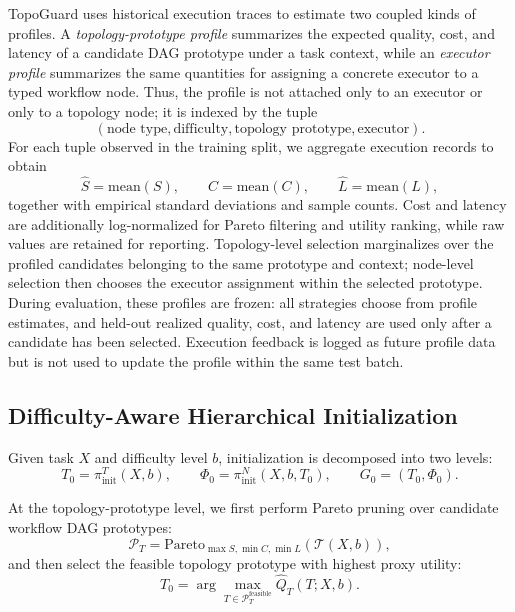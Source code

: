 \documentclass[acmsmall,review,anonymous]{acmart}
\begin{document}
TopoGuard uses historical execution traces to estimate two coupled kinds of profiles. A \emph{topology-prototype profile} summarizes the expected quality, cost, and latency of a candidate DAG prototype under a task context, while an \emph{executor profile} summarizes the same quantities for assigning a concrete executor to a typed workflow node. Thus, the profile is not attached only to an executor or only to a topology node; it is indexed by the tuple
\[
(\text{node type},\text{difficulty},\text{topology prototype},\text{executor}).
\]
For each tuple observed in the training split, we aggregate execution records to obtain
\[
\widehat{S}=\mathrm{mean}(S),\qquad
\widehat{C}=\mathrm{mean}(C),\qquad
\widehat{L}=\mathrm{mean}(L),
\]
together with empirical standard deviations and sample counts. Cost and latency are additionally log-normalized for Pareto filtering and utility ranking, while raw values are retained for reporting. Topology-level selection marginalizes over the profiled candidates belonging to the same prototype and context; node-level selection then chooses the executor assignment within the selected prototype. During evaluation, these profiles are frozen: all strategies choose from profile estimates, and held-out realized quality, cost, and latency are used only after a candidate has been selected. Execution feedback is logged as future profile data but is not used to update the profile within the same test batch.

\subsection{Difficulty-Aware Hierarchical Initialization}

Given task $X$ and difficulty level $b$, initialization is decomposed into two levels:
\begin{equation}
T_0=\pi_{\text{init}}^{T}(X,b),
\qquad
\Phi_0=\pi_{\text{init}}^{N}(X,b,T_0),
\qquad
G_0=(T_0,\Phi_0).
\end{equation}

At the topology-prototype level, we first perform Pareto pruning over candidate workflow DAG prototypes:
\begin{equation}
\mathcal{P}_T=\text{Pareto}_{\max S,\min C,\min L}(\mathcal{T}(X,b)),
\end{equation}
and then select the feasible topology prototype with highest proxy utility:
\begin{equation}
T_0=\arg\max_{T\in\mathcal{P}_T^{\text{feasible}}}\widehat{Q}_T(T;X,b).
\end{equation}
\end{document}
